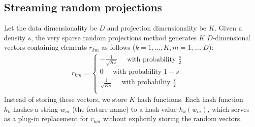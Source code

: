 \documentclass[11pt,onecolumn]{article}
\begin{document}

\pagebreak
\subsection{Streaming random projections}

Let the data dimensionality be $D$ and projection dimensionality be $K$. Given a density $s$, the very sparse random projections method \parencite{li2006very} generates $K$ $D$-dimensional vectors containing elements $r_{km}$ as follows ($k = 1, \dots, K, m = 1, \dots, D$):
\begin{eqnarray}
	r_{km} = \begin{cases}
		-\frac{1}{\sqrt{Ks}}\quad\textrm{ with probability }\frac{s}{2}\nonumber\\
		0\quad\textrm{ with probability }1 - s\nonumber\\
		\frac{1}{\sqrt{Ks}}\quad\textrm{ with probability }\frac{s}{2}\\
	\end{cases}
	\label{eq:randomprojections}
\end{eqnarray}
Instead of storing these vectors, we store $K$ hash functions. Each hash function $h_k$ hashes a string $w_m$ (the feature name) to a hash value $h_k(w_m)$, which serves as a plug-in replacement for $r_{km}$ without explicitly storing the random vectors.
\end{document}
